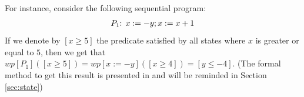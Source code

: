 \documentclass[a4paper,10pt]{llncs}
\begin{document}



For instance, consider the following sequential program:
\begin{align*}
 P_1\textnormal{: } x := -y ; x := x+1
\end{align*}
If we denote by $[x \geq 5]$ the predicate satisfied by all states where $x$ is greater or equal to $5$, then we get that $wp[P_1]([x \geq 5]) = wp[x := -y]([x \geq 4]) = [y \leq -4]$. (The formal method to get this result is presented in \cite{Dijkstra76} and will be reminded in Section \ref{sec:state})\bigskip
\end{document}

